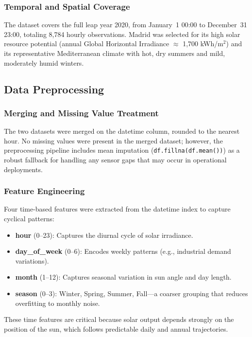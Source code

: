 \documentclass[11pt, a4paper]{article}
\begin{document}
\subsubsection{Temporal and Spatial Coverage}

The dataset covers the full leap year 2020, from January~1 00:00 to
December~31 23:00, totaling 8,784 hourly observations. Madrid was selected for
its high solar resource potential (annual Global Horizontal Irradiance
$\approx$ 1,700 kWh/m$^2$) and its representative Mediterranean climate with
hot, dry summers and mild, moderately humid winters.

\subsection{Data Preprocessing}

\subsubsection{Merging and Missing Value Treatment}

The two datasets were merged on the datetime column, rounded to the nearest hour.
No missing values were present in the merged dataset; however, the preprocessing
pipeline includes mean imputation (\texttt{df.fillna(df.mean())}) as a robust
fallback for handling any sensor gaps that may occur in operational deployments.

\subsubsection{Feature Engineering}

Four time-based features were extracted from the datetime index to capture
cyclical patterns:

\begin{itemize}
    \item \textbf{hour} (0--23): Captures the diurnal cycle of solar irradiance.
    \item \textbf{day\_of\_week} (0--6): Encodes weekly patterns (e.g., industrial
    demand variations).
    \item \textbf{month} (1--12): Captures seasonal variation in sun angle and day length.
    \item \textbf{season} (0--3): Winter, Spring, Summer, Fall---a coarser grouping
    that reduces overfitting to monthly noise.
\end{itemize}

These time features are critical because solar output depends strongly on the
position of the sun, which follows predictable daily and annual trajectories.
\end{document}
